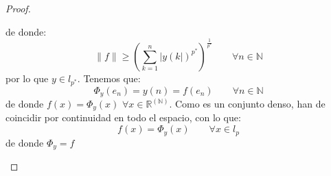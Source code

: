 \begin{prop}
\begin{proof}
\begin{itemize}
\begin{equation*}
                \end{equation*}
                de donde:
                \begin{equation*}
                    \|f\| \geq {\left(\sum_{k=1}^{n}{|y(k|)}^{p^\ast}\right)}^{\frac{1}{p^\ast}} \qquad \forall n\in \mathbb{N}
                \end{equation*}
                por lo que $y\in l_{p^\ast}$. Tenemos que:
                \begin{equation*}
                    \Phi_y(e_n) = y(n) = f(e_n) \qquad \forall n\in \mathbb{N}
                \end{equation*}
                de donde $f(x) = \Phi_y(x)$ $\forall x\in \mathbb{R}^{(\mathbb{N})}$. Como es un conjunto denso, han de coincidir por continuidad en todo el espacio, con lo que:
                \begin{equation*}
                    f(x) = \Phi_y(x) \qquad \forall x\in l_p
                \end{equation*}
                de donde $\Phi_y = f$
        \end{itemize}
    \end{proof}
\end{prop}







